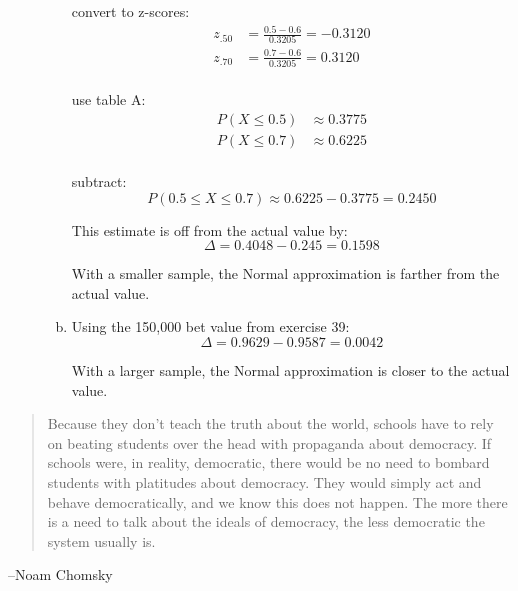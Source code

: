 \documentclass[letterpaper, landscape]{exam}
\begin{document}
\begin{description}
\begin{enumerate}[(a)]
            convert to z-scores:
            \begin{align*}
              z_{.50} &= \frac{0.5 - 0.6}{0.3205} = -0.3120 \\
              z_{.70} &= \frac{0.7 - 0.6}{0.3205} = 0.3120 \\
            \end{align*}

            use table A:\@
            \begin{align*}
              P(X \leq 0.5) & \approx 0.3775 \\
              P(X \leq 0.7) & \approx 0.6225 \\
            \end{align*}

            subtract:
            \[
              P(0.5 \leq X \leq 0.7) \approx 0.6225 - 0.3775 = 0.2450
            \]

            This estimate is off from the actual value by:
            \[
              \Delta = 0.4048 - 0.245 = \boxed{ 0.1598 }
            \]

            With a smaller sample, the Normal approximation is farther from the
            actual value.
            
          \item Using the 150,000 bet value from exercise 39:
            \[
              \Delta = 0.9629 - 0.9587 = \boxed{ 0.0042 }
            \]

            With a larger sample, the Normal approximation is closer to the
            actual value.

        \end{enumerate}
  \end{description}

  \else
    \vspace{10 cm}
    \begin{quote}
      \begin{em}
        Because they don't teach the truth about the world, schools have to rely on
        beating students over the head with propaganda about democracy. If schools were,
        in reality, democratic, there would be no need to bombard students with
        platitudes about democracy. They would simply act and behave democratically, and
        we know this does not happen. The more there is a need to talk about the ideals
        of democracy, the less democratic the system usually is.
      \end{em}
    \end{quote}
    \hspace{1 cm} --Noam Chomsky
  \fi
\end{document}
